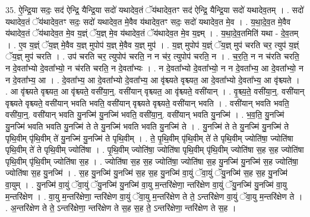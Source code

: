 \documentclass[17pt]{extarticle}
\begin{document}
35. ऐ॒न्द्रि॒या सदः॒ सद॑ ऐन्द्रि॒ यैन्द्रि॒या सदो॑ यथादेव॒तं ॅय॑थादेव॒तꣳ सद॑ ऐन्द्रि॒ यैन्द्रि॒या सदो॑ यथादेव॒तम् । . सदो॑ यथादेव॒तं ॅय॑थादेव॒तꣳ सदः॒ सदो॑ यथादेव॒त मे॒वैव य॑थादेव॒तꣳ सदः॒ सदो॑ यथादेव॒त मे॒व । . य॒था॒दे॒व॒त मे॒वैव य॑थादेव॒तं ॅय॑थादेव॒त मे॒व य॒ज्ञ्ं ॅय॒ज्ञ् मे॒व य॑थादेव॒तं ॅय॑थादेव॒त मे॒व य॒ज्ञ्म् । . य॒था॒दे॒व॒तमिति॑ यथा - दे॒व॒तम् । . ए॒व य॒ज्ञ्ं ॅय॒ज्ञ् मे॒वैव य॒ज्ञ् मुपोप॑ य॒ज्ञ् मे॒वैव य॒ज्ञ् मुप॑ । . य॒ज्ञ् मुपोप॑ य॒ज्ञ्ं ॅय॒ज्ञ् मुप॑ चरति चर॒ त्युप॑ य॒ज्ञ्ं ॅय॒ज्ञ् मुप॑ चरति । . उप॑ चरति चर॒ त्युपोप॑ चरति॒ न न च॑र॒ त्युपोप॑ चरति॒ न । . च॒र॒ति॒ न न च॑रति चरति॒ न दे॒वता᳚भ्यो दे॒वता᳚भ्यो॒ न च॑रति चरति॒ न दे॒वता᳚भ्यः । . न दे॒वता᳚भ्यो दे॒वता᳚भ्यो॒ न न दे॒वता᳚भ्य॒ आ दे॒वता᳚भ्यो॒ न न दे॒वता᳚भ्य॒ आ । . दे॒वता᳚भ्य॒ आ दे॒वता᳚भ्यो दे॒वता᳚भ्य॒ आ वृ॑श्च्यते वृश्च्यत॒ आ दे॒वता᳚भ्यो दे॒वता᳚भ्य॒ आ वृ॑श्च्यते । . आ वृ॑श्च्यते वृश्च्यत॒ आ वृ॑श्च्यते॒ वसी॑या॒न्॒. वसी॑यान् वृश्च्यत॒ आ वृ॑श्च्यते॒ वसी॑यान् । . वृ॒श्च्य॒ते॒ वसी॑या॒न्॒. वसी॑यान् वृश्च्यते वृश्च्यते॒ वसी॑यान् भवति भवति॒ वसी॑यान् वृश्च्यते वृश्च्यते॒ वसी॑यान् भवति । . वसी॑यान् भवति भवति॒ वसी॑या॒न्॒. वसी॑यान् भवति यु॒नज्मि॑ यु॒नज्मि॑ भवति॒ वसी॑या॒न्॒. वसी॑यान् भवति यु॒नज्मि॑ । . भ॒व॒ति॒ यु॒नज्मि॑ यु॒नज्मि॑ भवति भवति यु॒नज्मि॑ ते ते यु॒नज्मि॑ भवति भवति यु॒नज्मि॑ ते । . यु॒नज्मि॑ ते ते यु॒नज्मि॑ यु॒नज्मि॑ ते पृथि॒वीम् पृ॑थि॒वीम् ते॑ यु॒नज्मि॑ यु॒नज्मि॑ ते पृथि॒वीम् । . ते॒ पृ॒थि॒वीम् पृ॑थि॒वीम् ते॑ ते पृथि॒वीम् ज्योति॑षा॒ ज्योति॑षा पृथि॒वीम् ते॑ ते पृथि॒वीम् ज्योति॑षा । . पृ॒थि॒वीम् ज्योति॑षा॒ ज्योति॑षा पृथि॒वीम् पृ॑थि॒वीम् ज्योति॑षा स॒ह स॒ह ज्योति॑षा पृथि॒वीम् पृ॑थि॒वीम् ज्योति॑षा स॒ह । . ज्योति॑षा स॒ह स॒ह ज्योति॑षा॒ ज्योति॑षा स॒ह यु॒नज्मि॑ यु॒नज्मि॑ स॒ह ज्योति॑षा॒ ज्योति॑षा स॒ह यु॒नज्मि॑ । . स॒ह यु॒नज्मि॑ यु॒नज्मि॑ स॒ह स॒ह यु॒नज्मि॑ वा॒युं ॅवा॒युं ॅयु॒नज्मि॑ स॒ह स॒ह यु॒नज्मि॑ वा॒युम् । . यु॒नज्मि॑ वा॒युं ॅवा॒युं ॅयु॒नज्मि॑ यु॒नज्मि॑ वा॒यु म॒न्तरि॑क्षेणा॒ न्तरि॑क्षेण वा॒युं ॅयु॒नज्मि॑ यु॒नज्मि॑ वा॒यु म॒न्तरि॑क्षेण । . वा॒यु म॒न्तरि॑क्षेणा॒ न्तरि॑क्षेण वा॒युं ॅवा॒यु म॒न्तरि॑क्षेण ते ते॒ ऽन्तरि॑क्षेण वा॒युं ॅवा॒यु म॒न्तरि॑क्षेण ते । . अ॒न्तरि॑क्षेण ते ते॒ ऽन्तरि॑क्षेणा॒ न्तरि॑क्षेण ते स॒ह स॒ह ते॒ ऽन्तरि॑क्षेणा॒ न्तरि॑क्षेण ते स॒ह । \newline
\pagebreak
{}
\end{document}
